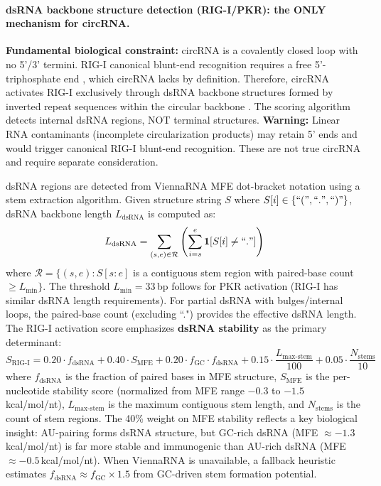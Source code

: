\paragraph{dsRNA backbone structure detection (RIG-I/PKR): the ONLY mechanism for circRNA.}
\textbf{Fundamental biological constraint:} circRNA is a covalently closed loop with no 5'/3' termini. RIG-I canonical blunt-end recognition requires a free 5'-triphosphate end \citep{schlee2009}, which circRNA lacks by definition. Therefore, circRNA activates RIG-I exclusively through dsRNA backbone structures formed by inverted repeat sequences within the circular backbone \citep{zhang2016}. The scoring algorithm detects internal dsRNA regions, NOT terminal structures. \textbf{Warning:} Linear RNA contaminants (incomplete circularization products) may retain 5' ends and would trigger canonical RIG-I blunt-end recognition. These are not true circRNA and require separate consideration.

dsRNA regions are detected from ViennaRNA MFE dot-bracket notation using a stem extraction algorithm. Given structure string $S$ where $S[i] \in \{``(", ``.", ``)"\}$, dsRNA backbone length $L_{\text{dsRNA}}$ is computed as:
\begin{equation}
L_{\text{dsRNA}} = \sum_{(s,e) \in \mathcal{R}} \left( \sum_{i=s}^{e} \mathbf{1}[S[i] \neq ``."] \right)
\end{equation}
where $\mathcal{R} = \{(s,e) : S[s:e]$ is a contiguous stem region with paired-base count $\geq L_{\min}\}$. The threshold $L_{\min}=33$\,bp follows \citet{nallagatla2007} for PKR activation (RIG-I has similar dsRNA length requirements). For partial dsRNA with bulges/internal loops, the paired-base count (excluding ``.") provides the effective dsRNA length. The RIG-I activation score emphasizes \textbf{dsRNA stability} as the primary determinant:
\begin{equation}
S_{\text{RIG-I}} = 0.20 \cdot f_{\text{dsRNA}} + 0.40 \cdot S_{\text{MFE}} + 0.20 \cdot f_{\text{GC}} \cdot f_{\text{dsRNA}} + 0.15 \cdot \frac{L_{\text{max-stem}}}{100} + 0.05 \cdot \frac{N_{\text{stems}}}{10}
\end{equation}
where $f_{\text{dsRNA}}$ is the fraction of paired bases in MFE structure, $S_{\text{MFE}}$ is the per-nucleotide stability score (normalized from MFE range $-0.3$ to $-1.5$\,kcal/mol/nt), $L_{\text{max-stem}}$ is the maximum contiguous stem length, and $N_{\text{stems}}$ is the count of stem regions. The 40\% weight on MFE stability reflects a key biological insight: AU-pairing forms dsRNA structure, but GC-rich dsRNA (MFE $\approx -1.3$\,kcal/mol/nt) is far more stable and immunogenic than AU-rich dsRNA (MFE $\approx -0.5$\,kcal/mol/nt). When ViennaRNA is unavailable, a fallback heuristic estimates $f_{\text{dsRNA}} \approx f_{\text{GC}} \times 1.5$ from GC-driven stem formation potential.


